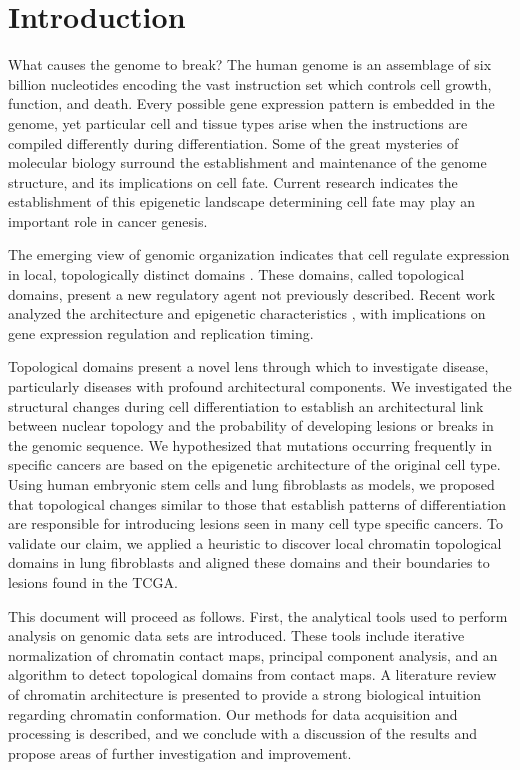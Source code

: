
\chapter{Introduction}

What causes the genome to break?  The human genome is an assemblage of six billion nucleotides encoding the vast instruction set
which controls cell growth, function, and death.  Every possible gene expression pattern is embedded in the genome, yet particular
cell and tissue types arise when the instructions are compiled differently during differentiation.  Some of the great mysteries
of molecular biology surround the establishment and maintenance of the genome structure, and its implications on cell fate. 
Current research indicates the establishment of this \gls{epigenetic} landscape determining cell fate may play an important
role in cancer genesis.

The emerging view of genomic organization indicates that cell regulate expression in local, topologically distinct domains
\citep{guelen2008,dixon2012,pope2014}.  These domains, called topological domains, present a new regulatory agent not
previously described.  Recent work analyzed the architecture \citep{imakaev2012} and epigenetic characteristics
\citep{dixon2012, pope2014}, with implications on gene expression regulation and replication timing.

Topological domains present a novel lens through which to investigate disease, particularly diseases with profound architectural components.
We investigated the structural changes during cell differentiation to establish an architectural link between
nuclear topology and the probability of developing lesions or breaks in the genomic sequence.  We hypothesized that mutations
occurring frequently in specific cancers are based on the epigenetic architecture of the original cell type.  Using human
embryonic stem cells and lung fibroblasts as models, we proposed that topological changes similar to those that establish
patterns of differentiation are responsible for introducing lesions seen in many cell type specific cancers.  To validate our
claim, we applied a heuristic to discover local chromatin topological domains in lung fibroblasts and aligned these domains and
their boundaries to lesions found in the \gls{TCGA}.

This document will proceed as follows.  First, the analytical tools used to perform analysis on genomic data sets are introduced.
These tools include iterative normalization of chromatin contact maps, principal component analysis, and an algorithm to detect
topological domains from contact maps.  A literature review of chromatin architecture is presented to
provide a strong biological intuition regarding chromatin conformation.  Our methods for data acquisition and processing is
described, and we conclude with a discussion of the results and propose areas of further investigation and improvement.
